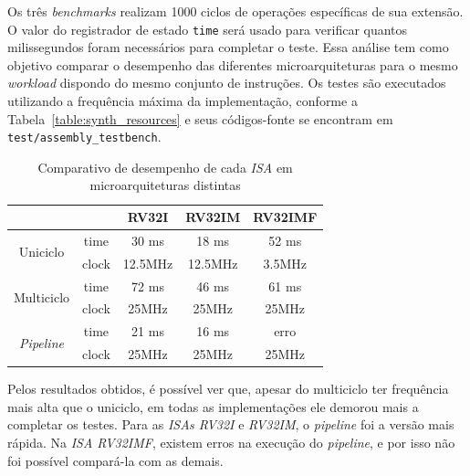    { Os três \textit{benchmarks} realizam 1000 ciclos de operações específicas de sua
        extensão. O valor do registrador de estado \texttt{time} será usado para verificar
        quantos milissegundos foram necessários para completar o teste.  Essa análise tem
        como objetivo comparar o desempenho das diferentes microarquiteturas para o mesmo
        \textit{workload} dispondo do mesmo conjunto de instruções. Os testes são executados
        utilizando a frequência máxima da implementação, conforme a
        Tabela~\ref{table:synth_resources} e seus códigos-fonte se encontram
        em \texttt{test/assembly\_testbench}.
    }

    \begin{longtable}{cc|c|c|c|}
        \caption{Comparativo de desempenho de cada \textit{ISA} em microarquiteturas distintas}\label{table:benchmark}\\
        \cline{3-5}
                                                                &                               & RV32I       & RV32IM      & RV32IMF   \\
        \hline
        \endfirsthead
        \endhead
        \multicolumn{1}{|c}{\multirow{2}{*}{{Uniciclo}}}        & \multicolumn{1}{|c|}{time}    & 30 ms       & 18 ms       & 52 ms \\
        \cline{2-5}
        \multicolumn{1}{|c}{ }                                  & \multicolumn{1}{|c|}{clock}   & 12.5MHz     & 12.5MHz     & 3.5MHz \\
        \hline
        \multicolumn{1}{|c}{\multirow{2}{*}{{Multiciclo}}}      & \multicolumn{1}{|c|}{time}    & 72 ms       & 46 ms       & 61 ms \\
        \cline{2-5}
        \multicolumn{1}{|c}{ }                                  & \multicolumn{1}{|c|}{clock}   & 25MHz       & 25MHz       & 25MHz \\
        \hline
        \multicolumn{1}{|c}{\multirow{2}{*}{\textit{Pipeline}}} & \multicolumn{1}{|c|}{time}    & 21 ms       & 16 ms       & erro \\
        \cline{2-5}
        \multicolumn{1}{|c}{ }                                  & \multicolumn{1}{|c|}{clock}   & 25MHz       & 25MHz       & 25MHz \\
        \hline
    \end{longtable}

    { Pelos resultados obtidos, é possível ver que, apesar do multiciclo ter
        frequência mais alta que o uniciclo, em todas as implementações ele demorou
        mais a completar os testes. Para as \textit{ISAs RV32I} e \textit{RV32IM},
        o \textit{pipeline} foi a versão mais rápida. Na \textit{ISA RV32IMF},
        existem erros na execução do \textit{pipeline}, e por isso não foi possível
        compará-la com as demais.
    }

